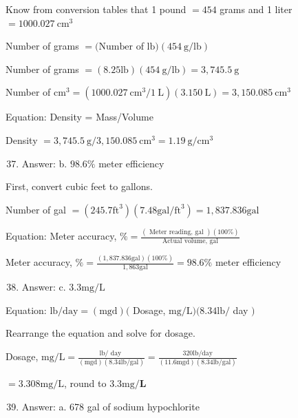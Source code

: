 \documentclass[10pt]{article}
\begin{document}
Know from conversion tables that 1 pound $=454$ grams and 1 liter $=1000.027 \mathrm{~cm}^{3}$

Number of grams $=(\mathrm{Number}$ of $\mathrm{lb})(454 \mathrm{~g} / \mathrm{lb})$

Number of grams $=(8.25 \mathrm{lb})(454 \mathrm{~g} / \mathrm{lb})=3,745.5 \mathrm{~g}$

Number of $\mathrm{cm}^{3}=\left(1000.027 \mathrm{~cm}^{3} / 1 \mathrm{~L}\right)(3.150 \mathrm{~L})=3,150.085 \mathrm{~cm}^{3}$

Equation: Density = Mass/Volume

Density $=3,745.5 \mathrm{~g} / 3,150.085 \mathrm{~cm}^{3}=1.19 \mathrm{~g} / \mathrm{cm}^{3}$

\begin{enumerate}
  \setcounter{enumi}{36}
  \item Answer: b. $98.6 \%$ meter efficiency
\end{enumerate}

First, convert cubic feet to gallons.

Number of gal $=\left(245.7 \mathrm{ft}^{3}\right)\left(7.48 \mathrm{gal} / \mathrm{ft}^{3}\right)=1,837.836 \mathrm{gal}$

Equation: Meter accuracy, $\%=\frac{(\text { Meter reading, gal })(100 \%)}{\text { Actual volume, gal }}$

Meter accuracy, $\%=\frac{(1,837.836 \mathrm{gal})(100 \%)}{1,863 \mathrm{gal}}=98.6 \%$ meter efficiency

\begin{enumerate}
  \setcounter{enumi}{37}
  \item Answer: c. $3.3 \mathrm{mg} / \mathrm{L}$
\end{enumerate}

Equation: $\mathrm{lb} / \mathrm{day}=(\mathrm{mgd})($ Dosage, $\mathrm{mg} / \mathrm{L})(8.34 \mathrm{lb} /$ day $)$

Rearrange the equation and solve for dosage.

Dosage, $\mathrm{mg} / \mathrm{L}=\frac{\mathrm{lb} / \text { day }}{(\mathrm{mgd})(8.34 \mathrm{lb} / \mathrm{gal})}=\frac{320 \mathrm{lb} / \mathrm{day}}{(11.6 \mathrm{mgd})(8.34 \mathrm{lb} / \mathrm{gal})}$

$=3.308 \mathrm{mg} / \mathrm{L}$, round to $3.3 \mathrm{mg} / \mathbf{L}$

\begin{enumerate}
  \setcounter{enumi}{38}
  \item Answer: a. 678 gal of sodium hypochlorite
\end{enumerate}
\end{document}
